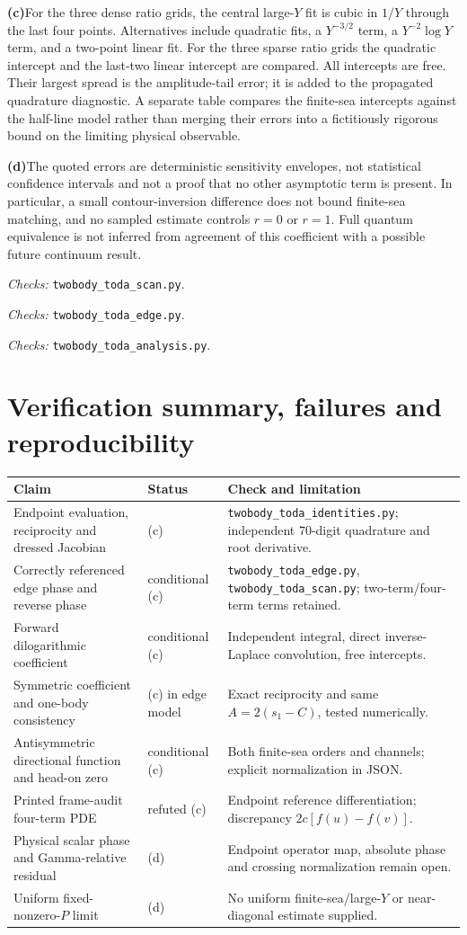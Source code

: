 \documentclass[11pt,a4paper]{article}
\newcommand{\C}{\textbf{(c)}\nobreakspace}
\newcommand{\D}{\textbf{(d)}\nobreakspace}
\newcommand{\file}[1]{\nolinkurl{#1}}
\newcommand{\checks}[1]{\par\noindent\textit{Checks:} \file{twobody_toda_#1.py}.\par}
\begin{document}
\C For the three dense ratio grids, the central large-$Y$ fit is cubic
in $1/Y$ through the last four points. Alternatives include quadratic
fits, a $Y^{-3/2}$ term, a $Y^{-2}\log Y$ term, and a two-point linear
fit. For the three sparse ratio grids the quadratic intercept and the
last-two linear intercept are compared. All intercepts are free. Their
largest spread is the amplitude-tail error; it is added to the propagated
quadrature diagnostic. A separate table compares the finite-sea intercepts
against the half-line model rather than merging their errors into a
fictitiously rigorous bound on the limiting physical observable.



\D The quoted errors are deterministic sensitivity envelopes, not
statistical confidence intervals and not a proof that no other asymptotic
term is present. In particular, a small contour-inversion difference does
not bound finite-sea matching, and no sampled estimate controls $r=0$ or
$r=1$. Full quantum equivalence is not inferred from agreement of this
coefficient with a possible future continuum result.
\checks{scan}\checks{edge}\checks{analysis}

\section{Verification summary, failures and reproducibility}
\begin{longtable}{@{}L{5.4cm}L{2.1cm}L{7.3cm}@{}}
\toprule Claim & Status & Check and limitation\\\midrule\endhead
Endpoint evaluation, reciprocity and dressed Jacobian & (c) &
\file{twobody_toda_identities.py}; independent 70-digit quadrature and root derivative.\\
Correctly referenced edge phase and reverse phase & conditional (c) &
\file{twobody_toda_edge.py}, \file{twobody_toda_scan.py}; two-term/four-term terms retained.\\
Forward dilogarithmic coefficient & conditional (c) &
Independent integral, direct inverse-Laplace convolution, free intercepts.\\
Symmetric coefficient and one-body consistency & (c) in edge model &
Exact reciprocity and same $A=2(s_1-C)$, tested numerically.\\
Antisymmetric directional function and head-on zero & conditional (c) &
Both finite-sea orders and channels; explicit normalization in JSON.\\
Printed frame-audit four-term PDE & refuted (c) &
Endpoint reference differentiation; discrepancy $2c[f(u)-f(v)]$.\\
Physical scalar phase and Gamma-relative residual & (d) &
Endpoint operator map, absolute phase and crossing normalization remain open.\\
Uniform fixed-nonzero-$P$ limit & (d) &
No uniform finite-sea/large-$Y$ or near-diagonal estimate supplied.\\
\bottomrule
\end{longtable}
\end{document}
